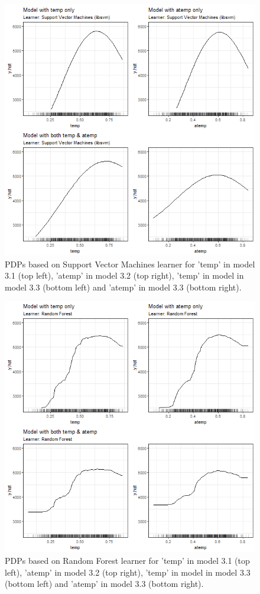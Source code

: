\documentclass[]{krantz}
\begin{document}
\begin{figure}

{\centering \includegraphics[width=0.8\linewidth]{images/VK_PDP_5_Correlated_numerical_SVM} 

}

\caption{PDPs based on Support Vector Machines learner for 'temp' in model 3.1 (top left), 'atemp' in model 3.2 (top right), 'temp' in model in model 3.3 (bottom left) and 'atemp' in model 3.3 (bottom right).}\label{fig:Figure05}
\end{figure}

\begin{figure}

{\centering \includegraphics[width=0.8\linewidth]{images/VK_PDP_6_Correlated_numerical_RF} 

}

\caption{PDPs based on Random Forest learner for 'temp' in model 3.1 (top left), 'atemp' in model 3.2 (top right), 'temp' in model in model 3.3 (bottom left) and 'atemp' in model 3.3 (bottom right).}\label{fig:Figure06}
\end{figure}
\end{document}
